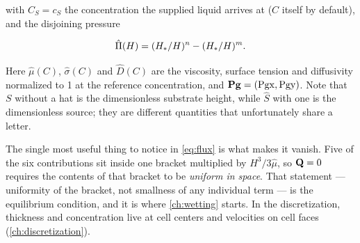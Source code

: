 with $C_S = c_S$ the concentration the supplied liquid arrives at ($C$ itself
by default), and the disjoining pressure

\begin{equation}\label{eq:pihat}
  \hat{\Pi}(H) = (H_{*}/H)^{n} - (H_{*}/H)^{m}.
\end{equation}

Here $\hat{\mu}(C)$, $\hat{\sigma}(C)$ and $\hat{D}(C)$ are the viscosity,
surface tension and diffusivity normalized to 1 at the reference concentration, and $\mathbf{Pg} = (\mathrm{Pgx}, \mathrm{Pgy})$.
Note that $S$ without a hat is the dimensionless substrate height, while
$\hat{S}$ with one is the dimensionless source; they are different quantities
that unfortunately share a letter.

The single most useful thing to notice in \cref{eq:flux} is what makes it
vanish. Five of the six contributions sit inside one bracket multiplied by
$H^{3}/3\hat{\mu}$, so $\mathbf{Q} = 0$ requires the contents of that bracket to be
\emph{uniform in space}. That statement --- uniformity of the bracket, not
smallness of any individual term --- is the equilibrium condition, and it is
where \cref{ch:wetting} starts. In the discretization, thickness and
concentration live at cell centers and velocities on cell faces
(\cref{ch:discretization}).
